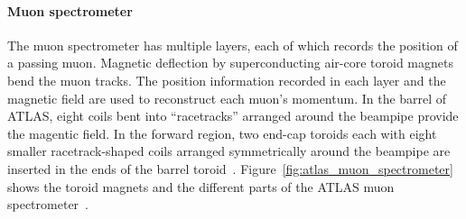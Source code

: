 \paragraph*{Muon spectrometer} \hfill \break
The muon spectrometer has multiple layers, each of which records the position of a passing muon. Magnetic deflection by superconducting air-core toroid magnets bend the muon tracks. The position information recorded in each layer and the magnetic field are used to reconstruct each muon's momentum. In the barrel of ATLAS, eight coils bent into ``racetracks'' arranged around the beampipe provide the magentic field. In the forward region, two end-cap toroids each with eight smaller racetrack-shaped coils arranged symmetrically around the beampipe are inserted in the ends of the barrel toroid~\cite{atlas_magnet_tdr}. Figure~\ref{fig:atlas_muon_spectrometer} shows the toroid magnets and the different parts of the ATLAS muon spectrometer~\cite{collaboration_atlas_2008}.

